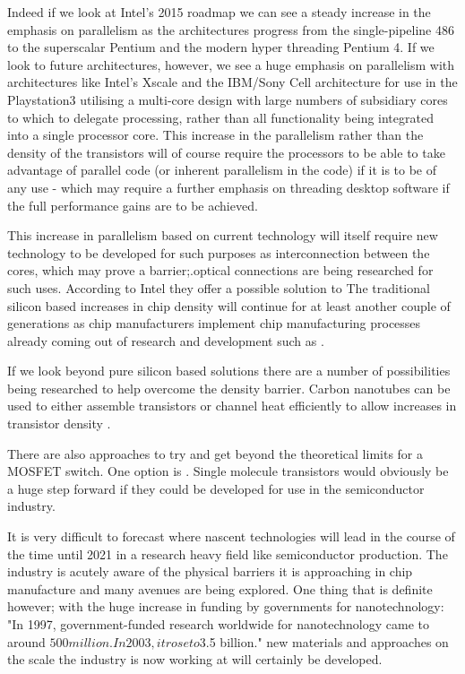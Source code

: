 \documentclass[a4paper,12pt]{article}
\begin{document}
Indeed if we look at Intel's 2015 roadmap \cite[]{e3} we can see a steady
increase in the emphasis on parallelism as the architectures progress
from the single-pipeline 486 to the superscalar Pentium and the modern
hyper threading Pentium 4. If we look to future architectures, however,
we see a huge emphasis on parallelism with architectures like Intel's
Xscale and the IBM/Sony Cell architecture for use in the Playstation3
utilising a multi-core design with large numbers of subsidiary cores to
which to delegate processing, rather than all functionality being
integrated into a single processor core. This increase in the
parallelism rather than the density of the transistors will of course
require the processors to be able to take advantage of parallel code (or
inherent parallelism in the code) if it is to be of any use - which may
require a further emphasis on threading desktop software if the full
performance gains are to be achieved.

This increase in parallelism based on current technology will itself
require new technology to be developed for such purposes as
interconnection between the cores, which may prove a barrier;.optical
connections are being researched for such uses. According to Intel they
offer a possible solution to \cite[signal distortion, impedance mismatch,
cross-talk and electromagnetic interference that can arise as copper
interconnects reach higher and higher speeds."]{e4} The traditional
silicon based increases in chip density will continue for at least
another couple of generations as chip manufacturers implement chip
manufacturing processes already coming out of research and development
such as \cite[High-k Gate Dialectric Material]{e4}.

If we look beyond pure silicon based solutions there are a number of
possibilities being researched to help overcome the density barrier.
Carbon nanotubes can be used to either assemble transistors or channel
heat efficiently to allow increases in transistor density \cite[]{e4}.

There are also approaches to try and get beyond the theoretical limits
for a MOSFET switch. One option is \cite[single molecule transistors as have
recently been developed]{e5}. Single molecule transistors would obviously
be a huge step forward if they could be developed for use in the
semiconductor industry.

It is very difficult to forecast where nascent technologies will lead in
the course of the time until 2021 in a research heavy field like
semiconductor production. The industry is acutely aware of the physical
barriers it is approaching in chip manufacture and many avenues are
being explored. One thing that is definite however; with the huge
increase in funding by governments for nanotechnology: "In 1997,
government-funded research worldwide for nanotechnology came to around
$500 million. In 2003, it rose to $3.5 billion." new materials and
approaches on the scale the industry is now working at will certainly be
developed.
\end{document}
